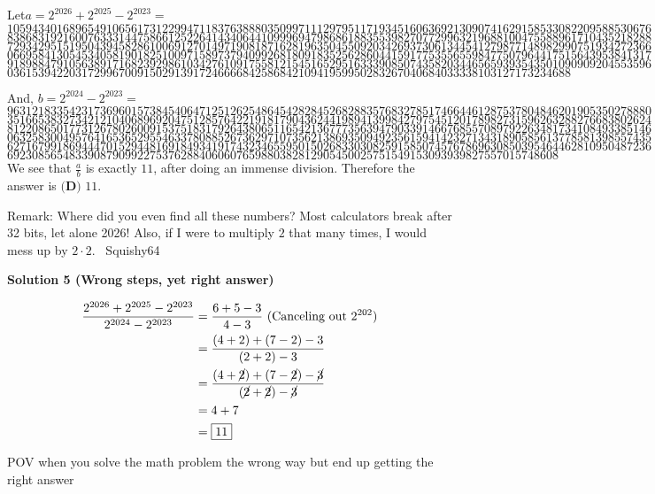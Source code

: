 \begin{enumerate}
 Let$a=2^{2026}+2^{2025}-2^{2023}=$
 \[10594340168965491065617312299471183763888035099711129795117193451606369213090741629158533082209588530676\]
 \[83868319216007633314475866125226414340644109996947986861883553982707729963219688100475588961710435218288\]
 \[72934295151950439458286100691270149719081871628196350455092034269373061344541279877148982990751934272366\]
 \[06695841305453405819018251009715897379409926818091835256286044159177535565598477507964417515643953841317\]
 \[91898847910563891716823929861034276109175581215451652951633390850743582034465659393543501090909204553596\]
 \[0361539422031729967009150291391724666684258684210941959950283267040684033338103127173234688\]

 And, $b=2^{2024}-2^{2023}=$
 \[96312183354231736960157384540647125126254864542828452682883576832785174664461287537804846201905350278880\]
 \[35166538327342121040689692047512857642219181790436244198941399842797545120178982731596263288276683802624\]
 \[81220865017731267802600915375183179264380651165421367773563947903391466768557089792263481734108493385146\]
 \[06325830049576416536529554633780885267362971073562138693509492356159414232713431890585613778581398557435\]
 \[62716799186944470152944816918493419174323465595015026833030825915850745767869630850395464462810950487236\]
 \[69230856548339087909922753762884060607659880382812905450025751549153093939827557015748608\]We see that $\frac{a}{b}$ is exactly $11$, after doing an immense division. Therefore the answer is $\boxed{\textbf{(D) } 11}$.

 Remark: Where did you even find all these numbers? Most calculators break after 32 bits, let alone 2026! Also, if I were to multiply $2$ that many times, I would mess up by $2\cdot2$. ~Squishy64

 



\textbf{Solution 5 (Wrong steps, yet right answer)}

\begin{align*}\frac{2^{2026}+2^{2025}-2^{2023}}{2^{2024}-2^{2023}} &= \frac{6+5-3}{4-3} \text{ (Canceling out }2^{202}\text{)} \\&= \frac{(4+2)+(7-2)-3}{(2+2)-3} \\&= \frac{(4+\cancel{2})+(7-\cancel{2})-\cancel{3}}{(\cancel{2}+\cancel{2})-\cancel{3}} \\&= 4+7 \\&= \boxed{11}\end{align*}


 POV when you solve the math problem the wrong way but end up getting the right answer


\end{enumerate}
